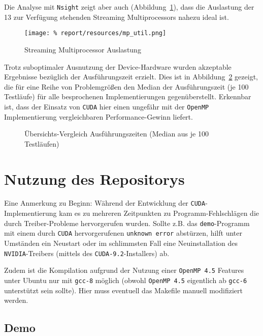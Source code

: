 \documentclass[
    bibliography=totoc, cd=lightcolor, cdmath=false, ngerman]{tudscrreprt}
\begin{document}
Die Analyse mit \texttt{Nsight} zeigt aber auch (Abbildung~\ref{fig:shm}), dass
die Auslastung der 13 zur Verfügung stehenden Streaming Multiprocessors
nahezu ideal ist.

\begin{figure}[htbp]
  \begin{center}
    \texttt{[image: \%
    report/resources/mp\_util.png]}
  \end{center}
  \caption{Streaming Multiprocessor Auslastung}
  \label{fig:shm}
\end{figure}

Trotz suboptimaler Ausnutzung der Device-Hardware wurden akzeptable Ergebnisse
bezüglich der Ausführungszeit erzielt. Dies ist in Abbildung~\ref{fig:all}
gezeigt, die für eine Reihe von Problemgrößen den Median der Ausführungszeit
(je 100 Testläufe) für alle besprochenen Implementierungen gegenüberstellt.
Erkennbar ist, dass der Einsatz von \texttt{CUDA} hier einen ungefähr mit der
\texttt{OpenMP} Implementierung vergleichbaren Performance-Gewinn liefert.

\begin{figure}[htbp]
  \centering
    
  \caption{Übersichts-Vergleich Ausführungszeiten (Median aus je 100 Testläufen)}
  \label{fig:all}
\end{figure}

\chapter{Nutzung des Repositorys}

Eine Anmerkung zu Beginn: Während der Entwicklung der
\texttt{CUDA}-Implementierung kam es zu mehreren Zeitpunkten zu
Programm-Fehlschlägen die durch Treiber-Probleme hervorgerufen wurden. Sollte
z.B. das \texttt{demo}-Programm mit einem durch \texttt{CUDA} hervorgerufenen
\texttt{unknown error} abstürzen, hilft unter Umständen ein Neustart oder im
schlimmsten Fall eine Neuinstallation des \texttt{NVIDIA}-Treibers (mittels des
\texttt{CUDA-9.2}-Installers) ab.

Zudem ist die Kompilation aufgrund der Nutzung einer \texttt{OpenMP 4.5}
Features unter Ubuntu nur mit \texttt{gcc-8} möglich (obwohl \texttt{OpenMP 4.5}
eigentlich ab \texttt{gcc-6} unterstützt sein sollte). Hier muss eventuell das
Makefile manuell modifiziert werden.

\section{Demo}
\end{document}
